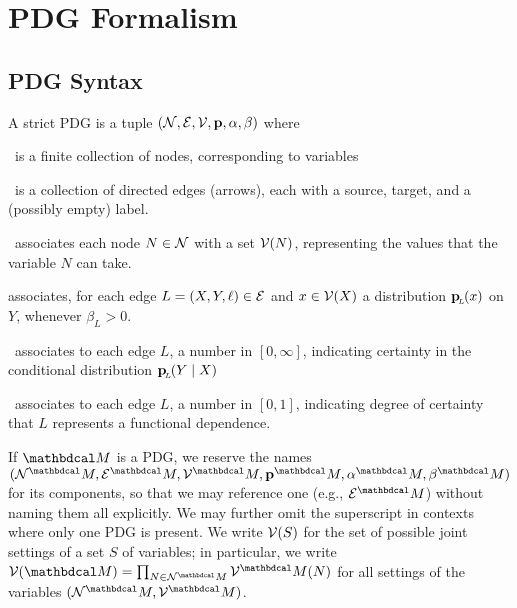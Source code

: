 \documentclass[the-pdg-manual.tex]{subfiles}
\begin{document}
	\section{PDG Formalism}
	\subsection{PDG Syntax}
	\def\pdgvars[#1]{(\N#1, \Ed#1, \V#1, \mat p#1, \alpha#1,\beta#1)}
	\begin{defn}[sPDG]\label{def:sPDG}
		A strict PDG is a tuple $\pdgvars[]$ where
		\begin{description}[nosep]
			\item[$\N$]~is a finite collection of nodes, 
				corresponding to variables
			\item[$\Ed$]~is a collection of directed edges (arrows), each with a source, target, and a (possibly empty) label.
			\item[$\V$]~associates each node $N \in \mathcal N$ with a set $\mathcal V(N)$,
			representing the values that the variable $N$ can take. 
			\item[$\mathbf p$] associates, for each edge $L = (X,Y, \ell) \in \mathcal E$ and $x \in \mathcal V(X)$ a distribution $\mathbf{p}_{\!_{L}\!}(x)$ on $Y$, whenever $\beta_L > 0$.
			\item[$\bbeta$]~associates to each edge $L$, a number in $[0,\infty]$, indicating certainty in the conditional distribution $\mathbf{p}_{\!_{L}\!}(Y \mid X)$ 
			\item[$\balpha$]~associates to each edge $L$, a number in $[0,1]$, indicating degree of certainty that $L$ represents a functional dependence.
		\end{description}
		\vspace{-1.4em}
	\end{defn}

	If $\dg M$ is a PDG, we reserve the names $\pdgvars[^\dg M]$
	for its components, so that we may reference one (e.g.,
	$\Ed^\dg M$) without naming them all explicitly. We may further omit the superscript in contexts where only one PDG is present. 
	We write $\mathcal V(S)$ for the set of possible joint settings of a set $S$
	of variables; in particular, 
	we write $\V(\dg M)
	= \prod_{N \in \N^\dg M} \V^\dg M(N)$
	for all settings of the variables $(\N^\dg M, \V^\dg M)$.
	
\end{document}
